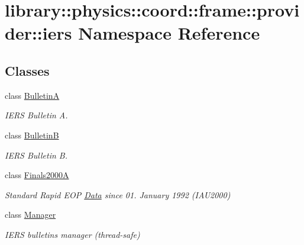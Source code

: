 \hypertarget{namespacelibrary_1_1physics_1_1coord_1_1frame_1_1provider_1_1iers}{}\section{library\+:\+:physics\+:\+:coord\+:\+:frame\+:\+:provider\+:\+:iers Namespace Reference}
\label{namespacelibrary_1_1physics_1_1coord_1_1frame_1_1provider_1_1iers}
\subsection*{Classes}
\begin{DoxyCompactItemize}
\item 
class \hyperlink{classlibrary_1_1physics_1_1coord_1_1frame_1_1provider_1_1iers_1_1_bulletin_a}{BulletinA}
\begin{DoxyCompactList}\small\item\em I\+E\+RS Bulletin A. \end{DoxyCompactList}\item 
class \hyperlink{classlibrary_1_1physics_1_1coord_1_1frame_1_1provider_1_1iers_1_1_bulletin_b}{BulletinB}
\begin{DoxyCompactList}\small\item\em I\+E\+RS Bulletin B. \end{DoxyCompactList}\item 
class \hyperlink{classlibrary_1_1physics_1_1coord_1_1frame_1_1provider_1_1iers_1_1_finals2000_a}{Finals2000A}
\begin{DoxyCompactList}\small\item\em Standard Rapid E\+OP \hyperlink{structlibrary_1_1physics_1_1coord_1_1frame_1_1provider_1_1iers_1_1_finals2000_a_1_1_data}{Data} since 01. January 1992 (I\+A\+U2000) \end{DoxyCompactList}\item 
class \hyperlink{classlibrary_1_1physics_1_1coord_1_1frame_1_1provider_1_1iers_1_1_manager}{Manager}
\begin{DoxyCompactList}\small\item\em I\+E\+RS bulletins manager (thread-\/safe) \end{DoxyCompactList}\end{DoxyCompactItemize}
